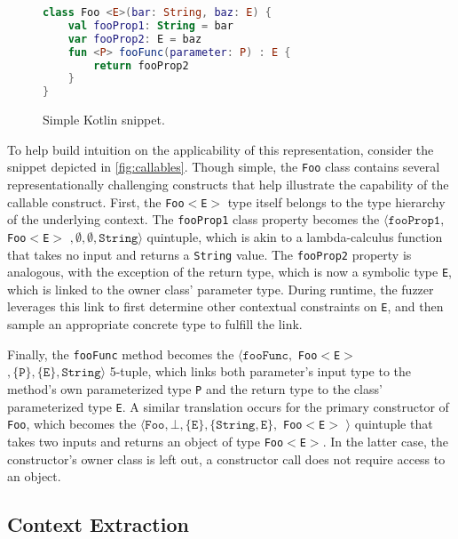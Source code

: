 \lstset{
  basicstyle=\footnotesize, frame=tb,
  xleftmargin=.2\textwidth, xrightmargin=.2\textwidth,
  numbers=left, stepnumber=1,
}

\begin{figure}
\begin{lstlisting}[language=Kotlin]
class Foo <E>(bar: String, baz: E) {
    val fooProp1: String = bar
    var fooProp2: E = baz
    fun <P> fooFunc(parameter: P) : E {
        return fooProp2
    }
}
\end{lstlisting}
\caption{Simple Kotlin snippet.}
\label{fig:callables}
\end{figure}

To help build intuition on the applicability of this representation,
consider the snippet depicted in \autoref{fig:callables}.
Though simple, the \texttt{Foo} class contains several representationally
challenging constructs that help illustrate the capability of the callable construct.
First, the \texttt{Foo$<$E$>$} type itself belongs to the type hierarchy
of the underlying context. 
The \texttt{fooProp1} class property becomes the
$\langle \texttt{fooProp1},$ \texttt{Foo$<$\texttt{E}$>$} $, \emptyset, \emptyset, \texttt{String} \rangle$
quintuple, which is akin to a lambda-calculus function that takes no input and returns a \texttt{String} value.
The \texttt{fooProp2} property is analogous, with the exception of the return type,
which is now a symbolic type \texttt{E}, which is linked to the owner class' parameter type.
During runtime, the fuzzer leverages this link to first determine other contextual constraints
on \texttt{E}, and then sample an appropriate concrete type to fulfill the link.

Finally, the \texttt{fooFunc} method becomes the 
$\langle \texttt{fooFunc},$ \texttt{Foo$<$\texttt{E}$>$} $,
\{ \texttt{P} \}, \{ \texttt{E} \}, \texttt{String} \rangle$
5-tuple, which links both parameter's input type to the method's
own parameterized type \texttt{P} and the return type to the 
class' parameterized type \texttt{E}.
A similar translation occurs for the primary constructor of \texttt{Foo},
which becomes the 
$\langle \texttt{Foo}, \bot, \{ \texttt{E} \}, 
\{ \texttt{String}, \texttt{E} \},$ \texttt{Foo$<$\texttt{E}$>$} $\rangle$
quintuple that takes two inputs and returns an object of type \texttt{Foo$<$E$>$}.
In the latter case, the constructor's owner class is left out,
a constructor call does not require access to an object.

\subsection{\label{subsec:context-extraction}Context Extraction}

